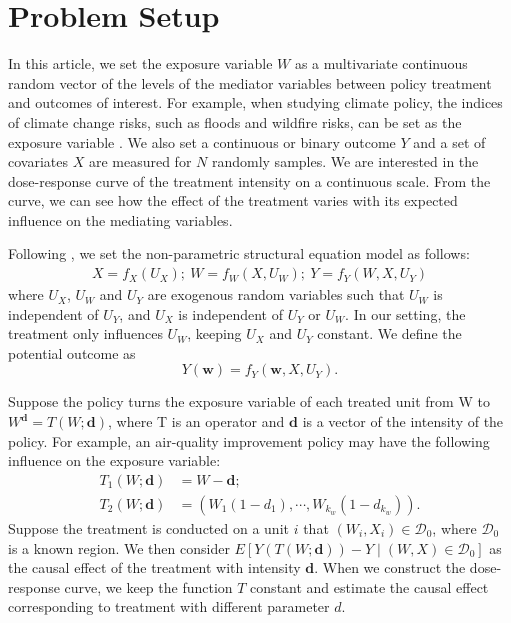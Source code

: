 \documentclass[11pt]{article}
\numberwithin{equation}{section}
\theoremstyle{definition}
\begin{document}
\section{Problem Setup}
In this article, we set the exposure variable $W$ as a multivariate continuous random vector of the levels of the mediator variables between policy treatment and outcomes of interest. For example, when studying climate policy, the indices of climate change risks, such as floods and wildfire risks, can be set as the exposure variable \citep{lewis2023characterizing}. We also set a continuous or binary outcome $Y$ and a set of covariates $X$ are measured for $N$ randomly samples.
We are interested in the dose-response curve of the treatment intensity on a continuous scale. From the curve, we can see how the effect of the treatment varies with its expected influence on the mediating variables. 


Following \cite{pearl2000models}, we set the non-parametric structural equation model as follows: 
\begin{align}
    X = f_X(U_X);\ W = f_W(X, U_W );\ Y = f_Y (W, X, U_Y )
\end{align} 
where  $U_{X}$, $U_{W}$ and  $U_{Y}$  are exogenous random variables such that  $U_{W}$ is independent of $ U_{Y}$, and $U_{X}$ is independent of $ U_{Y}$ or $U_{W}$. In our setting, the treatment only influences $U_W$, keeping $U_{X}$ and $U_{Y}$ constant. We define the potential outcome as
\begin{equation}
    Y(\mathbf{w}) = f_Y (\mathbf{w}, X, U_Y).
\end{equation}

Suppose the policy turns the exposure variable of each treated unit from W to $W^{\mathbf{d}}=T(W;\mathbf{d})$, where T is an operator and $\mathbf{d}$ is a vector of the intensity of the policy. For example, an air-quality improvement policy may have the following influence on the exposure variable:
\begin{align}
    T_1(W;\mathbf{d})&=W-\mathbf{d};\\
    T_2(W;\mathbf{d})&=(W_1(1-d_1),\cdots, W_{k_w}(1-d_{k_w})).
\end{align}
Suppose the treatment is conducted on a unit $i$ that $(W_i,X_i)\in\mathcal{D}_0$, where $\mathcal{D}_0$ is a known region. We then consider $E[Y(T(W;\mathbf{d}))-Y\mid (W,X)\in\mathcal{D}_0]$ as the causal effect of the treatment with intensity $\mathbf{d}$. When we construct the dose-response curve, we keep the function $T$ constant and estimate the causal effect corresponding to treatment with different parameter $d$.
\end{document}
